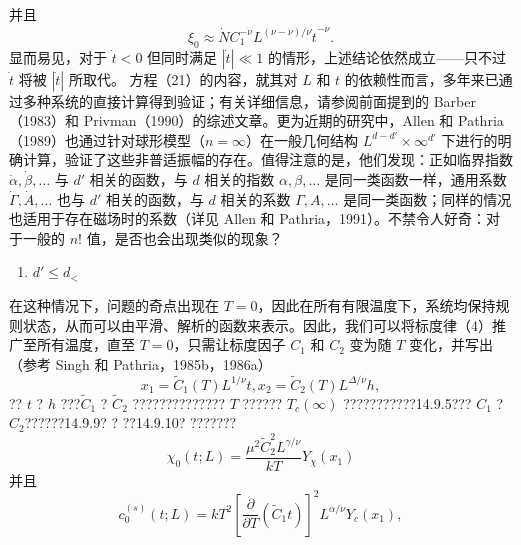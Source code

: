并且
\begin{equation}\tag{14.4.73}\label{eq:14.4.73}
\xi _ { 0 } \approx \dot { N } C _ { 1 } ^{- \dot { \nu} } L ^{( \nu - \dot { \nu} ) / \nu } \dot { t } ^{- \dot { \nu} } .
\end{equation}
显而易见，对于 \(\dot{t} < 0\) 但同时满足 \(|\dot{t}| \ll 1\) 的情形，上述结论依然成立——只不过 \(\dot{t}\) 将被 \(|\dot{t}|\) 所取代。
方程（21）的内容，就其对 \(L\) 和 \(t\) 的依赖性而言，多年来已通过多种系统的直接计算得到验证；有关详细信息，请参阅前面提到的 Barber（1983）和 Privman（1990）的综述文章。更为近期的研究中，Allen 和 Pathria（1989）也通过针对球形模型（\(n=\infty\)）在一般几何结构 \(L^{d-d'}\times\infty^{d'}\) 下进行的明确计算，验证了这些非普适振幅的存在。值得注意的是，他们发现：正如临界指数 \(\dot{\alpha}, \dot{\beta}, \ldots\) 与 \(d'\) 相关的函数，与 \(d\) 相关的指数 \(\alpha, \beta, \ldots\) 是同一类函数一样，通用系数 \(\dot{\Gamma}, \dot{A}, \ldots\) 也与 \(d'\) 相关的函数，与 \(d\) 相关的系数 \(\Gamma, A, \ldots\) 是同一类函数；同样的情况也适用于存在磁场时的系数（详见 Allen 和 Pathria，1991）。不禁令人好奇：对于一般的 \(n!\) 值，是否也会出现类似的现象？
\begin{enumerate}
\def\labelenumi{(\roman{enumi})}
\setcounter{enumi}{1}
\item
  \(d' \leq d_{<}\)
\end{enumerate}
在这种情况下，问题的奇点出现在 \(T=0\)，因此在所有有限温度下，系统均保持规则状态，从而可以由平滑、解析的函数来表示。因此，我们可以将标度律（4）推广至所有温度，直至 \(T=0\)，只需让标度因子 \(C_1\) 和 \(C_2\) 变为随 \(T\) 变化，并写出（参考 Singh 和 Pathria，1985b，1986a）
\begin{equation}\tag{14.4.74}\label{eq:14.4.74}
x _ { 1 } = \tilde { C } _ { 1 } ( T ) L ^{1 / \nu} t ,  x _ { 2 } = \tilde { C } _ { 2 } ( T ) L ^{\Delta / \nu} h ,
\end{equation}
?? \(t\) ? \(h\) ???\(\tilde{C}_{1}\) ? \(\tilde{C}_{2}\) ?????????????? \(T\) ?????? \(T_{c}(\infty)\) ???????????14.9.5??? \(C_{1}\) ? \(C_{2}\)??????14.9.9? ? ??14.9.10? ???????
\begin{equation}\tag{14.4.75}\label{eq:14.4.75}
\chi _ { 0 } ( t ; L ) = \frac { \mu ^{2} \tilde { C } _ { 2 } ^{2} L ^{\gamma / \nu} } { k T } Y _ { \chi } ( x _ { 1 } )
\end{equation}
并且
\begin{equation}\tag{14.4.76}\label{eq:14.4.76}
c _ { 0 } ^{( s )} ( t ; L ) = k T ^{2} \left[ \frac { \partial } { \partial T } ( \tilde { C } _ { 1 } t ) \right] ^{2} L ^{\alpha / \nu} Y _ { c } ( x _ { 1 } ) ,
\end{equation}
